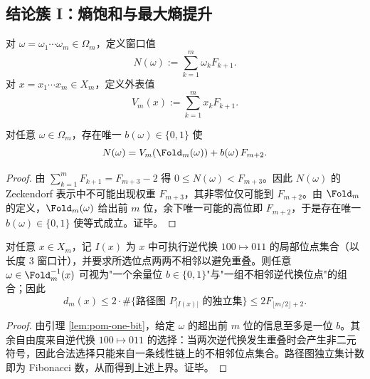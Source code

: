 \subsection{结论簇 I：熵饱和与最大熵提升}\label{subsec:pom-entropy-maxent}
\begin{definition}[窗口值与外表值]\label{def:pom-window-value}
对 $\omega=\omega_1\cdots\omega_m\in\Omega_m$，定义窗口值
\[
N(\omega):=\sum_{k=1}^m \omega_k F_{k+1}.
\]
对 $x=x_1\cdots x_m\in X_m$，定义外表值
\[
V_m(x):=\sum_{k=1}^m x_k F_{k+1}.
\]
\end{definition}

\begin{lemma}[单隐藏位分解]\label{lem:pom-one-bit}
对任意 $\omega\in\Omega_m$，存在唯一 $b(\omega)\in\{0,1\}$ 使
\[
N(\omega)=V_m(\Fold_m(\omega)) + b(\omega)\,F_{m+2}.
\]
\end{lemma}
\begin{proof}
由 $\sum_{k=1}^m F_{k+1}=F_{m+3}-2$ 得 $0\le N(\omega)<F_{m+3}$。因此 $N(\omega)$ 的 Zeckendorf 表示中不可能出现权重 $F_{m+3}$，其非零位仅可能到 $F_{m+2}$。由 $\Fold_m$ 的定义，$\Fold_m(\omega)$ 给出前 $m$ 位，余下唯一可能的高位即 $F_{m+2}$，于是存在唯一 $b(\omega)\in\{0,1\}$ 使等式成立。证毕。
\end{proof}

\begin{proposition}[纤维自由度的二层分解]\label{prop:pom-fiber-decompose}
对任意 $x\in X_m$，记 $I(x)$ 为 $x$ 中可执行逆代换 $100\mapsto 011$ 的局部位点集合（以长度 $3$ 窗口计），并要求所选位点两两不相邻以避免重叠。则任意 $\omega\in\Fold_m^{-1}(x)$ 可视为"一个余量位 $b\in\{0,1\}$"与"一组不相邻逆代换位点"的组合；因此
\[
d_m(x)\le 2\cdot \#\{\text{路径图 }P_{|I(x)|}\text{ 的独立集}\}
\le 2F_{\lfloor m/2\rfloor+2}.
\]
\end{proposition}
\begin{proof}
由引理 \ref{lem:pom-one-bit}，给定 $\omega$ 的超出前 $m$ 位的信息至多是一位 $b$。其余自由度来自逆代换 $100\mapsto 011$ 的选择：当两次逆代换发生重叠时会产生非二元符号，因此合法选择只能来自一条线性链上的不相邻位点集合。路径图独立集计数即为 Fibonacci 数，从而得到上述上界。证毕。
\end{proof}

